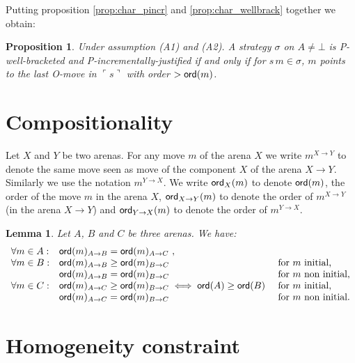 \documentclass{article}
\newcommand{\pview}[1]{\ulcorner #1 \urcorner}
\newcommand{\ord}[1]{{\sf ord}(#1)}
\newcommand{\ordx}[2]{{\sf ord}_{#1}(#2)}
\newtheorem{lemma}{Lemma}[section]
\newtheorem{proposition}{Proposition}[section]
\theoremstyle{remark}
\theoremstyle{definition}
\begin{document}
Putting proposition \ref{prop:char_pincr} and
\ref{prop:char_wellbrack} together we obtain:
\begin{proposition}
Under assumption (A1) and (A2).
A strategy $\sigma$ on $A\neq \bot$
is \emph{P-well-bracketed} and 
 \emph{P-incrementally-justified} if and only if
for $s \, m \in \sigma$, $m$ points to the last O-move in $\pview{s}$ with order $>\ord{m}$.
\end{proposition}

\section{Compositionality}


Let $X$ and $Y$ be two arenas.
For any move $m$ of the arena $X$ we write $m^{X\rightarrow Y}$ to denote the same move seen as move of the component $X$ of the arena $X\rightarrow Y$.
Similarly we use the notation $m^{Y\rightarrow X}$.
We write $\ordx{X}{m}$ to denote $\ord{m}$, the order of the move $m$ in the arena $X$, $\ordx{X\rightarrow Y}{m}$ to denote the order of $m^{X\rightarrow Y}$ (in the arena $X\rightarrow Y$) and $\ordx{Y\rightarrow X}{m}$ to denote the order of $m^{Y\rightarrow X}$.

\begin{lemma}
Let $A$, $B$ and $C$ be three arenas. We have:
$$\begin{array}{lll}
\forall m \in A: 
	&  \ord{m}_{A\rightarrow B} = \ord{m}_{A\rightarrow C} \ ,\\
\forall m \in B: 
	& \ord{m}_{A\rightarrow B} \geq \ord{m}_{B\rightarrow C}  & \mbox{for $m$ initial,}\\
	& \ord{m}_{A\rightarrow B} = \ord{m}_{B\rightarrow C} & \mbox{for $m$ non initial,} \\
\forall m \in C: 
	& \ord{m}_{A\rightarrow C} \geq \ord{m}_{B\rightarrow C} \iff 
\ord{A} \geq \ord{B}\ & \mbox{for $m$ initial,}\\
	& \ord{m}_{A\rightarrow C} = \ord{m}_{B\rightarrow C} 	& \mbox{for $m$ non initial.} 
\end{array}
$$
\end{lemma}





\section{Homogeneity constraint}
\end{document}
